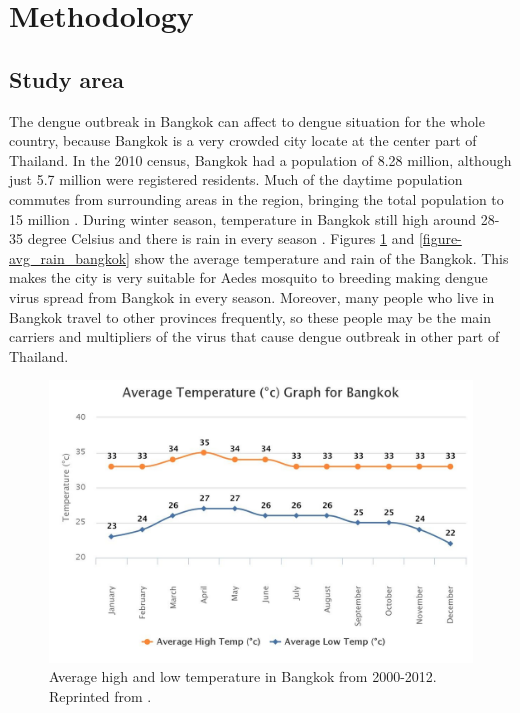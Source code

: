 \documentclass[review]{elsarticle}
\begin{document}
\section{Methodology}



\subsection{Study area}
\label{section-study-area}



The dengue outbreak in Bangkok can affect to dengue situation for the whole country, because Bangkok is a very crowded city  locate at the center part of Thailand. In the 2010 census, Bangkok had a population of 8.28 million, although just 5.7 million were registered residents. Much of the daytime population commutes from surrounding areas in the region, bringing the total population to 15 million \cite{WPR2015}. During winter season, temperature in Bangkok still high around 28-35 degree Celsius and there is rain in every season \cite {wwo2012}. Figures \ref{figure-avg_temp_bangkok} and \ref{figure-avg_rain_bangkok} show the average temperature and rain of the Bangkok. This makes the city is very suitable for Aedes mosquito to breeding making dengue virus spread from  Bangkok in every season. Moreover, many people who live in Bangkok travel to other provinces frequently, so these people may be the main carriers and multipliers of the virus that cause dengue outbreak in other part of Thailand. 

\begin{figure}[htbp]
	\begin{center}
		\includegraphics[width=145mm]{./figures/avg_temp_bangkok}
		\caption{Average high and low temperature in Bangkok from 2000-2012. Reprinted from \protect\cite{wwo2012}.}
		\label{figure-avg_temp_bangkok}
	\end{center}
\end{figure}
\end{document}

